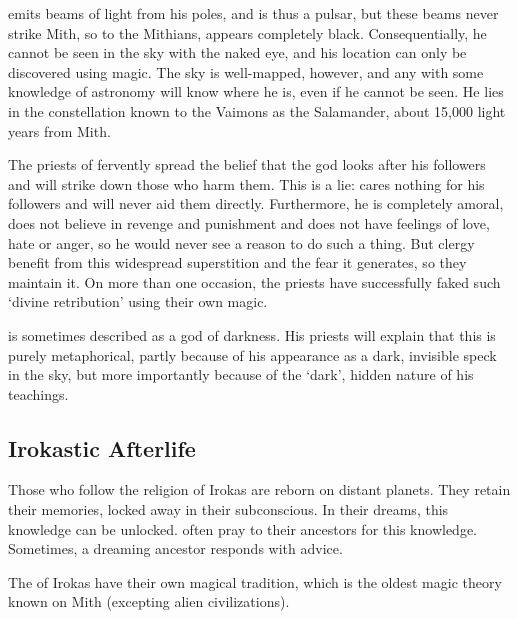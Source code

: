 \NerrhanKoss{} emits beams of light from his poles, and is thus a pulsar, but these beams never strike Mith, so to the Mithians, \NerrhanKoss{} appears completely black. Consequentially, he cannot be seen in the sky with the naked eye, and his location can only be discovered using magic. The sky is well-mapped, however, and any \dragon{} with some knowledge of astronomy will know where he is, even if he cannot be seen. He lies in the constellation known to the Vaimons as the Salamander, about 15,000 light years from Mith. 

The priests of \NerrhanKoss{} fervently spread the belief that the god looks after his followers and will strike down those who harm them. This is a lie: \NerrhanKoss{} cares nothing for his followers and will never aid them directly. Furthermore, he is completely amoral, does not believe in revenge and punishment and does not have feelings of love, hate or anger, so he would never see a reason to do such a thing. But \NerrhanKossz{} clergy benefit from this widespread superstition and the fear it generates, so they maintain it. On more than one occasion, the priests have successfully faked such `divine retribution' using their own magic. 

\NerrhanKoss{} is sometimes described as a god of darkness. His priests will explain that this is purely metaphorical, partly because of his appearance as a dark, invisible speck in the sky, but more importantly because of the `dark', hidden nature of his teachings. 



\subsection{Irokastic Afterlife}
Those who follow the religion of Irokas are reborn on distant planets. They retain their memories, locked away in their subconscious. In their dreams, this knowledge can be unlocked. \Dragons{} often pray to their ancestors for this knowledge. Sometimes, a dreaming ancestor responds with advice. 










\label{Draconic magic}\label{Irokas magic}
The \dragons{} of Irokas have their own magical tradition, which is the oldest magic theory known on Mith (excepting alien civilizations). 


